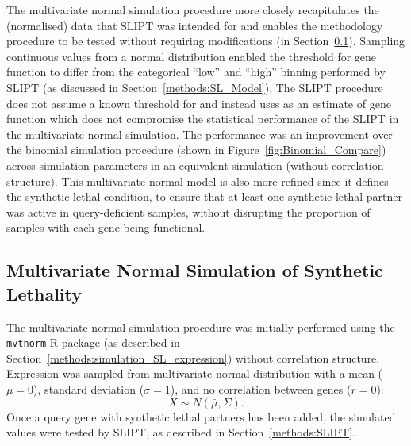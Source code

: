 The multivariate normal simulation procedure more closely recapitulates the (normalised)  data that \gls{SLIPT} was intended for and enables the methodology procedure to be tested without requiring modifications (in Section~\ref{chapt2:simulation_mvtnorm}). Sampling continuous  values from a normal distribution enabled the  threshold for gene function to differ from the categorical ``low'' and ``high''  binning performed by \gls{SLIPT} (as discussed in Section~\ref{methods:SL_Model}). The \gls{SLIPT} procedure does not assume a known threshold for  and instead uses  as an estimate of gene function which does not compromise the statistical performance of the \gls{SLIPT} in the multivariate normal simulation. The performance was an improvement over the binomial simulation procedure (shown in Figure~\ref{fig:Binomial_Compare}) across simulation parameters in an equivalent simulation (without correlation structure). This multivariate normal model is also more refined since it defines the \gls{synthetic lethal} condition, to ensure that at least one \gls{synthetic lethal} partner was active in query-deficient samples, without disrupting the proportion of samples with each gene being functional.

\FloatBarrier

\subsection{Multivariate Normal Simulation of Synthetic Lethality} \label{chapt2:simulation_mvtnorm}

The multivariate normal simulation procedure was initially performed using the \texttt{mvtnorm} R package \citep{Genz2009, mvtnorm} (as described in Section~\ref{methods:simulation_SL_expression}) without correlation structure. Expression was sampled from multivariate normal distribution with a mean ($\mu = 0$), standard deviation ($\sigma = 1$), and no correlation between genes ($r = 0$): $$X\sim N(\bar{\mu},\Sigma).$$ Once a query gene with \gls{synthetic lethal} partners has been added, the simulated  values were tested by \gls{SLIPT}, as described in Section~\ref{methods:SLIPT}.

